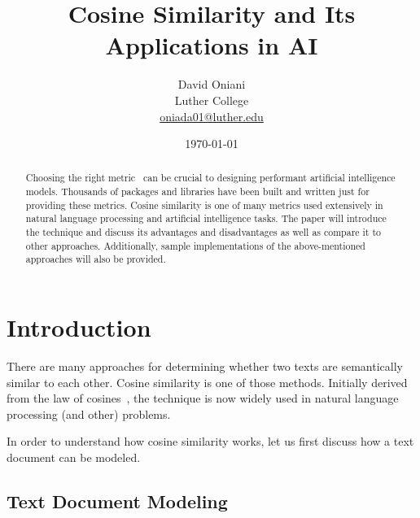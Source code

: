 \documentclass[11pt]{article}
\author{David Oniani\\
        Luther College\\
        \href{mailto:oniada01@luther.edu}{oniada01@luther.edu}}
\title{\textbf{Cosine Similarity and Its Applications in AI}}
\date{\today}
\begin{document}
\maketitle


\begin{abstract}
  \noindent Choosing the right metric~\cite{thomas2020} can be crucial to
  designing performant artificial intelligence models. Thousands of packages
  and libraries have been built and written just for providing these metrics.
  Cosine similarity is one of many metrics used extensively in natural language
  processing and artificial intelligence tasks. The paper will introduce the
  technique and discuss its advantages and disadvantages as well as compare it
  to other approaches. Additionally, sample implementations of the
  above-mentioned approaches will also be provided.
\end{abstract}


\newpage
\tableofcontents
\newpage


\section{Introduction}

There are many approaches for determining whether two texts are semantically
similar to each other. Cosine similarity is one of those methods. Initially
derived from the law of cosines~\cite{wikicosineproof}, the technique is now
widely used in natural language processing (and other) problems.

\bigskip

In order to understand how cosine similarity works, let us first discuss how
a text document can be modeled.

\subsection{Text Document Modeling}
\end{document}
